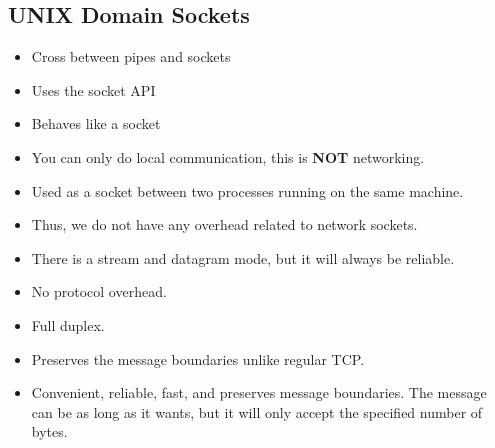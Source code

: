 \documentclass[]{article}
\begin{document}
\subsection{UNIX Domain Sockets}
\begin{itemize}
\item Cross between pipes and sockets
\item Uses the socket API
\item Behaves like a socket
\item You can only do local communication, this is \textbf{NOT} networking.
\item Used as a socket between two processes running on the same machine.
\item Thus, we do not have any overhead related to network sockets.
\item There is a stream and datagram mode, but it will always be reliable.
\item No protocol overhead.
\item Full duplex.
\item Preserves the message boundaries unlike regular TCP.
\item Convenient, reliable, fast, and preserves message boundaries. The message
can be as long as it wants, but it will only accept the specified number of
bytes.
\end{itemize}
\end{document}
